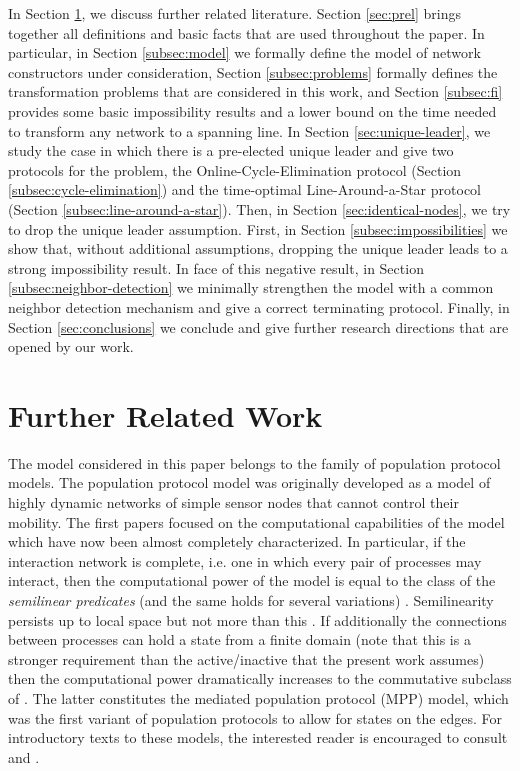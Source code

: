 \documentclass[preprint]{elsarticle}
\begin{document}
In Section \ref{sec:rw}, we discuss further related literature. Section \ref{sec:prel} brings together all definitions and basic facts that are used throughout the paper. In particular, in Section \ref{subsec:model} we formally define the model of network constructors under consideration, Section \ref{subsec:problems} formally defines the transformation problems that are considered in this work, and Section \ref{subsec:fi} provides some basic impossibility results and a lower bound on the time needed to transform any network to a spanning line. In Section \ref{sec:unique-leader}, we study the case in which there is a pre-elected unique leader and give two protocols for the problem, the Online-Cycle-Elimination protocol (Section \ref{subsec:cycle-elimination}) and the time-optimal Line-Around-a-Star protocol (Section \ref{subsec:line-around-a-star}). Then, in Section \ref{sec:identical-nodes}, we try to drop the unique leader assumption. First, in Section \ref{subsec:impossibilities} we show that, without additional assumptions, dropping the unique leader leads to a strong impossibility result. In face of this negative result, in Section \ref{subsec:neighbor-detection} we minimally strengthen the model with a common neighbor detection mechanism and give a correct terminating protocol. Finally, in Section \ref{sec:conclusions} we conclude and give further research directions that are opened by our work.  

\section{Further Related Work}
\label{sec:rw}

The model considered in this paper belongs to the family of population protocol models. The population protocol model \cite{AADFP06} was originally developed as a model of highly dynamic networks of simple sensor nodes that cannot control their mobility. The first papers focused on the computational capabilities of the model which have now been almost completely characterized. In particular, if the interaction network is complete, i.e. one in which every pair of processes may interact, then the computational power of the model is equal to the class of the \emph{semilinear predicates} (and the same holds for several variations) \cite{AAER07}. Semilinearity persists up to  local space but not more than this \cite{MNPS11}. If additionally the connections between processes can hold a state from a finite domain (note that this is a stronger requirement than the active/inactive that the present work assumes) then the computational power dramatically increases to the commutative subclass of  \cite{MCS11-2}. The latter constitutes the mediated population protocol (MPP) model, which was the first variant of population protocols to allow for states on the edges. For introductory texts to these models, the interested reader is encouraged to consult \cite{AR09} and \cite{MCS11}. 
\end{document}
